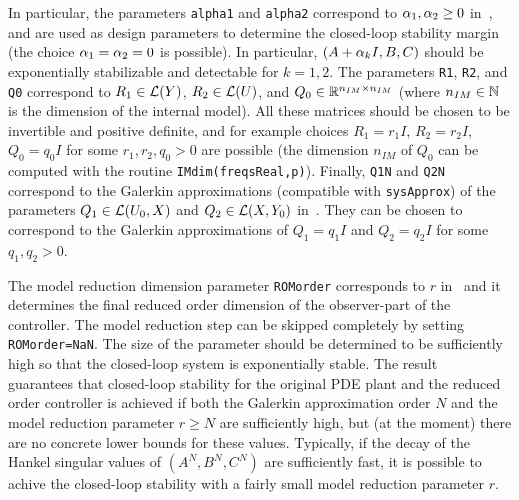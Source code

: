 \documentclass[11pt, a4paper]{amsart}
\theoremstyle{definition}
\numberwithin{equation}{section}
\begin{document}
\begin{itemize}
In particular, the parameters \texttt{alpha1} and \texttt{alpha2} correspond to $\alpha_1,\alpha_2\geq 0$ in~, and are used as design parameters to determine the closed-loop stability margin (the choice $\alpha_1=\alpha_2=0$ is possible). In particular, $(A+\alpha_k I,B,C)$ should be exponentially stabilizable and detectable for $k=1,2$.
The parameters 
\texttt{R1}, \texttt{R2}, and \texttt{Q0} correspond to $R_1\in {\mathcal{L}}(Y)$, $R_2\in {\mathcal{L}}(U)$, and $Q_0\in {\mathbb{R}}^{n_{IM}\times n_{IM}}$ (where $n_{IM}\in {\mathbb{N}}$ is the dimension of the internal model). All these matrices should be chosen to be invertible and positive definite, and for example choices $R_1=r_1 I$, $R_2=r_2 I$, $Q_0=q_0 I$ for some $r_1,r_2,q_0>0$ are possible
 (the dimension $n_{IM}$ of $Q_0$ can be computed with the routine \texttt{IMdim(freqsReal,p)}). Finally,
\texttt{Q1N} and \texttt{Q2N} correspond to  the Galerkin approximations (compatible with \texttt{sysApprox}) of the parameters $Q_1\in {\mathcal{L}}(U_0,X)$ and $Q_2\in {\mathcal{L}}(X,Y_0)$ in~. They
can be chosen to correspond to the Galerkin approximations of $Q_1=q_1 I$ and $Q_2=q_2 I$ for some  $q_1,q_2>0$.

The model reduction dimension parameter \texttt{ROMorder} corresponds to $r$ in~ and it determines the final reduced order dimension of the observer-part of the controller. The model reduction step can be skipped completely by setting \texttt{ROMorder=NaN}. The size of the parameter should be determined to be sufficiently high so that the closed-loop system is exponentially stable. The result~ guarantees that closed-loop stability for the original PDE plant and the reduced order controller is achieved if both the Galerkin approximation order $N$ and the model reduction parameter $r\geq N$ are sufficiently high, but (at the moment) there are no concrete lower bounds for these values. Typically, if the decay of the Hankel singular values of $(A^N,B^N,C^N)$ are sufficiently fast, it is possible to achive the closed-loop stability with a fairly small model reduction parameter $r$.

	\bigskip


\end{itemize}
\end{document}
